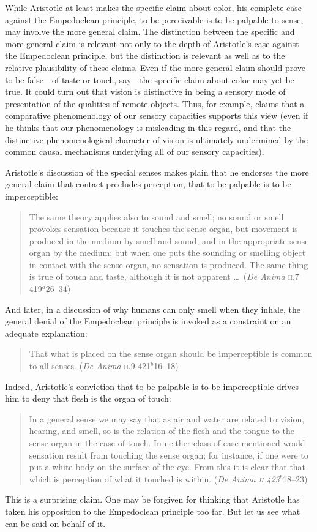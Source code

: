 While Aristotle at least makes the specific claim about color, his complete case against the Empedoclean principle, to be perceivable is to be palpable to sense, may involve the more general claim. The distinction between the specific and more general claim is relevant not only to the depth of Aristotle's case against the Empedoclean principle, but the distinction is relevant as well as to the relative plausibility of these claims. Even if the more general claim should prove to be false---of taste or touch, say---the specific claim about color may yet be true. It could turn out that vision is distinctive in being a sensory mode of presentation of the qualities of remote objects. Thus, for example, \citet[]{Broad:1952kx} claims that a comparative phenomenology of our sensory capacities supports this view (even if he thinks that our phenomenology is misleading in this regard, and that the distinctive phenomenological character of vision is ultimately undermined by the common causal mechanisms underlying all of our sensory capacities).

Aristotle's discussion of the special senses makes plain that he endorses the more general claim that contact precludes perception, that to be palpable is to be imperceptible:
\begin{quote}
	The same theory applies also to sound and smell; no sound or smell provokes sensation because it touches the sense organ, but movement is produced in the medium by smell and sound, and in the appropriate sense organ by the medium; but when one puts the sounding or smelling object in contact with the sense organ, no sensation is produced. The same thing is true of touch and taste, although it is not apparent \ldots\ (\emph{De Anima} \textsc{ii}.7 419\( ^{a} \)26--34)
\end{quote}
And later, in a discussion of why humans can only smell when they inhale, the general denial of the Empedoclean principle is invoked as a constraint on an adequate explanation:
\begin{quote}
	That what is placed on the sense organ should be imperceptible is common to all senses. (\emph{De Anima} \textsc{ii}.9 421\( ^{b} \)16--18)
\end{quote}

Indeed, Aristotle's conviction that to be palpable is to be imperceptible drives him to deny that flesh is the organ of touch:
\begin{quote}
    In a general sense we may say that as air and water are related to vision, hearing, and smell, so is the relation of the flesh and the tongue to the sense organ in the case of touch. In neither class of case mentioned would sensation result from touching the sense organ; for instance, if one were to put a white body on the surface of the eye. From this it is clear that that which is perception of what it touched is within. (\emph{De Anima \textsc{ii} 423\( ^{b} \)}18--23)
\end{quote}
This is a surprising claim. One may be forgiven for thinking that Aristotle has taken his opposition to the Empedoclean principle too far. But let us see what can be said on behalf of it.

